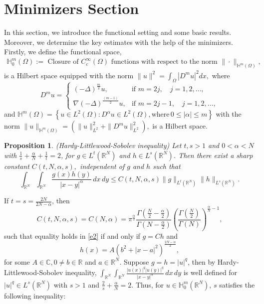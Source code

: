 \documentclass[reqno]{amsart}
\newtheorem{proposition}[theorem]{Proposition}
\newcommand{\Om}{\Omega}
\newcommand{\al} {\alpha}
\newcommand{\Ga} {\Gamma}
\newcommand{\noi} {  \noindent}
\newcommand{\mb} {\mathbb}
\numberwithin{theorem}{section} \numberwithin{equation}{section}
\begin{document}
\section{\bf{Minimizers Section}}
\noi In this section, we introduce the functional setting and some basic results. Moreover, we determine the key estimates with the help of the minimizers. Firstly, we define the functional space,
\begin{align*}
\mb{H}^m_0(\Om):= \text{ Closure of } {C_c^\infty(\Omega)} \text{ functions with respect to the norm } \|\cdot\|_{\mb{H}^m(\Om)},\end{align*}  is a Hilbert space equipped with the norm $\|u\|^2 = \int_{\Om} |D^m u|^2 dx, $
where\[D^m u = \begin{cases}
(-\Delta)^\frac{m}{2}u , & \text{if } m = 2j,\quad j = 1, 2, \ldots ,\\
\nabla(-\Delta)^\frac{(m-1)}{2} u , & \text{if } m = 2j - 1,\quad j = 1, 2, \ldots,
\end{cases}\]
and $\mb{H}^m(\Om)= \left\{u\in L^2(\Om): D^{\al} u\in L^2(\Om), \text {where} \,  0\leq|\al|\leq m \right\}$  with the norm $\|u\|_{\mb{H}^m(\Om)} = ( \|u\|_{L^2}^2 + \|D^m u\|_{L^2}^2 ),$ is a Hilbert space.\\
\begin{proposition}(Hardy-Littlewood-Sobolev inequality)%
Let $t, s>1$ and $0<\al<N$ with $\frac{1}{s}+\frac{\al}{N}+\frac{1}{t}= 2$, for $g\in L^t(\mb{R}^N)$ and $h\in L^s(\mb{R}^N)$. Then there exist a sharp constant $C(t, N, \al, s),$ independent of $g$ and $h$ such that
\begin{equation}\label{e2}
\int_{\mb{R}^N} \int_{\mb{R}^N} \frac{g(x) h(y)}{|x-y|^\al} \, dx \, dy \leq C(t, N, \al, s) \|g\|_{L^t(\mb{R}^N)} \|h\|_{L^s(\mb{R}^N)}.
\end{equation}
\end{proposition}
\noi If $t=s=\frac{2N}{2N-\al}$, then
  \[C(t, N, \al, s)=C(N, \al)=\pi^{\frac{\al}{2}}\frac{\Gamma(\frac{N}{2} -{\frac{\al}{2}})}{\Ga(N-{\frac{\al}{2}})}\left(\frac{\Ga(\frac{N}{2})}{\Ga{(N)}}\right)^{\frac{\al}{N}-1},\] 
 such that equality holds in \eqref{e2} if and only if $g = C h$ and
\[h(x) = A \left( b^2 + |x - a|^2 \right)^{\frac{2N-\al}{2}}, \] for some $A \in \mb C, 0\not=b\in\mb{R}$ and $a \in\mb{R}^N.$
Suppose $g=h=|u|^q$, then by Hardy-Littlewood-Sobolev inequality,
$\int_{\mb{R}^N} \int_{\mb{R}^N} \frac{|u(x)|^{q}|u(y)|^{q}}{|x - y|^{\al}} \, dx \, dy$ is well defined for $|u|^{q} \in L^s(\mb{R}^N)$ with $s>1$ and $\frac{2}{s} + \frac{\al}{N}=2$. Thus, for $u \in\mb {H}_0^m(\mb{R}^N)$, $s$ satisfies the following inequality:
\end{document}
